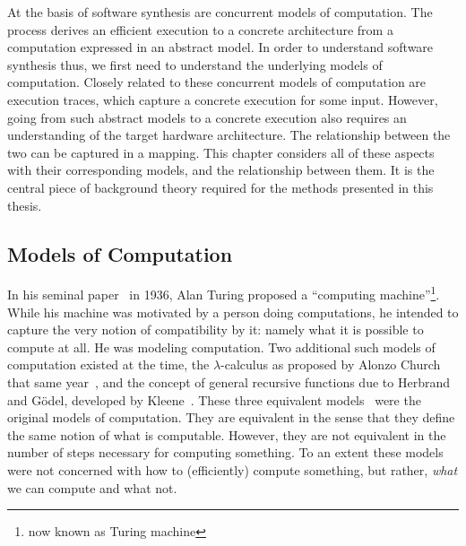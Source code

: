 At the basis of software synthesis are concurrent models of computation. The process derives an efficient execution to a concrete architecture from a computation expressed in an abstract model.
In order to understand software synthesis thus, we first need to understand the underlying models of computation.
Closely related to these concurrent models of computation are execution traces, which capture a concrete execution for some input.
However, going from such abstract models to a concrete execution also requires an understanding of the target hardware architecture.
The relationship between the two can be captured in a mapping.
This chapter considers all of these aspects with their corresponding models, and the relationship between them.
It is the central piece of background theory required for the methods presented in this thesis.

\subsection{Models of Computation}
\label{sec:mocs}

In his seminal paper~\cite{turing1936computable} in 1936, Alan Turing proposed a ``computing machine''\footnote{now known as Turing machine}.   
While his machine was motivated by a person doing computations, he intended to capture the very notion of compatibility by it: namely what it is possible to compute at all.
He was modeling computation.
Two additional such models of computation existed at the time, the $\lambda$-calculus as proposed by Alonzo Church that same year~\cite{church1936unsolvable}, and the concept of general recursive functions due to Herbrand and Gödel, developed by Kleene~\cite{kleene1936recursive}.
These three equivalent models~\cite{turing1937comuptability} were the original models of computation.
They are equivalent in the sense that they define the same notion of what is computable.
However, they are not equivalent in the number of steps necessary for computing something.
To an extent these models were not concerned with how to (efficiently) compute something, but rather, \emph{what} we can compute and what not.

